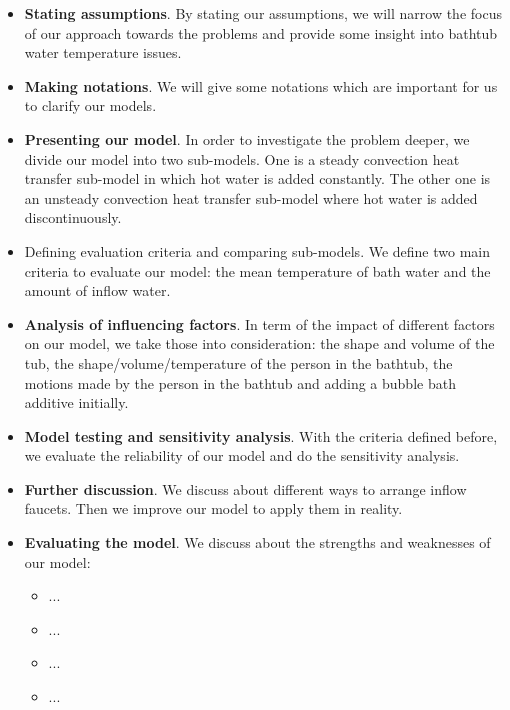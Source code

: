 \documentclass{mcmthesis}
\begin{document}
\begin{itemize}
\item {\bf Stating assumptions}. By stating our assumptions, we will narrow the focus of our approach towards the problems and provide some insight into bathtub water temperature issues.

\item {\bf Making notations}. We will give some notations which are important for us to clarify our models.

\item {\bf Presenting our model}. In order to investigate the problem deeper, we divide our model into two sub-models. One is a steady convection heat transfer sub-model in which hot water is added constantly. The other one is an unsteady convection heat transfer sub-model where hot water is added discontinuously.

\item {Defining evaluation criteria and comparing sub-models}. We define two main criteria to evaluate our model: the mean temperature of bath water and the amount of inflow water.

\item {\bf Analysis of influencing factors}. In term of the impact of different factors on our model, we take those into consideration: the shape and volume of the tub, the shape/volume/temperature of the person in the bathtub, the motions made by the person in the bathtub and adding a bubble bath additive initially.

\item {\bf Model testing and sensitivity analysis}. With the criteria defined before, we evaluate the reliability of our model and do the sensitivity analysis.

\item {\bf Further discussion}. We discuss about different ways to arrange inflow faucets. Then we improve our model to apply them in reality.

\item {\bf Evaluating the model}. We discuss about the strengths and weaknesses of our model:

\begin{itemize}
\item[1)] ... 
\item[2)] ...
\item[3)] ...
\item[4)] ...
\end{itemize}

\end{itemize}
\end{document}
